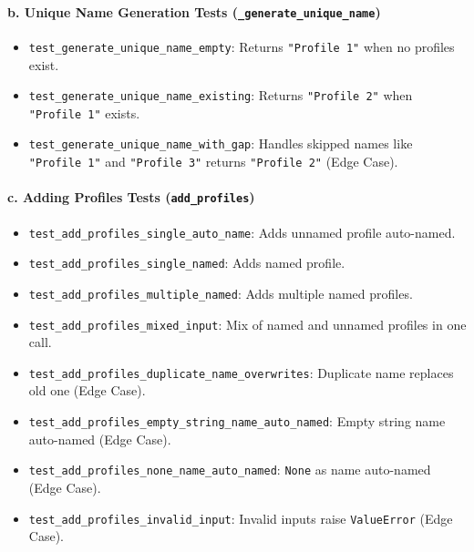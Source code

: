 \documentclass[12pt]{article}
\begin{document}
\paragraph{b. Unique Name Generation Tests (\texttt{\_generate\_unique\_name})}
\begin{itemize}
  \item \texttt{test\_generate\_unique\_name\_empty}: Returns \texttt{"Profile 1"} when no profiles exist.
  \item \texttt{test\_generate\_unique\_name\_existing}: Returns \texttt{"Profile 2"} when \texttt{"Profile 1"} exists.
  \item \texttt{test\_generate\_unique\_name\_with\_gap}: Handles skipped names like \texttt{"Profile 1"} and \texttt{"Profile 3"} \textrightarrow{} returns \texttt{"Profile 2"} (Edge Case).
\end{itemize}

\paragraph{c. Adding Profiles Tests (\texttt{add\_profiles})}
\begin{itemize}
  \item \texttt{test\_add\_profiles\_single\_auto\_name}: Adds unnamed profile \textrightarrow{} auto-named.
  \item \texttt{test\_add\_profiles\_single\_named}: Adds named profile.
  \item \texttt{test\_add\_profiles\_multiple\_named}: Adds multiple named profiles.
  \item \texttt{test\_add\_profiles\_mixed\_input}: Mix of named and unnamed profiles in one call.
  \item \texttt{test\_add\_profiles\_duplicate\_name\_overwrites}: Duplicate name replaces old one (Edge Case).
  \item \texttt{test\_add\_profiles\_empty\_string\_name\_auto\_named}: Empty string name \textrightarrow{} auto-named (Edge Case).
  \item \texttt{test\_add\_profiles\_none\_name\_auto\_named}: \texttt{None} as name \textrightarrow{} auto-named (Edge Case).
  \item \texttt{test\_add\_profiles\_invalid\_input}: Invalid inputs raise \texttt{ValueError} (Edge Case).
\end{itemize}
\end{document}
